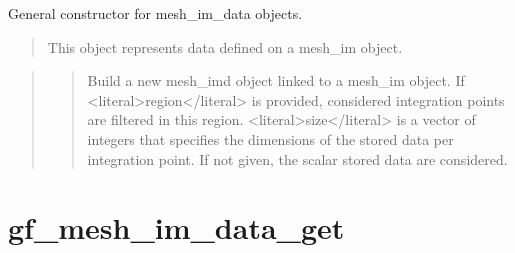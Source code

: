 \documentclass[a4paper,11pt,english]{sphinxmanual}
\begin{document}
\sphinxAtStartPar
{}

\sphinxAtStartPar
General constructor for mesh\_im\_data objects.
\begin{quote}

\sphinxAtStartPar
This object represents data defined on a mesh\_im object.
\end{quote}

\sphinxAtStartPar
{}
\begin{quote}

\sphinxAtStartPar
{}
\begin{quote}

\sphinxAtStartPar
Build a new mesh\_imd object linked to a mesh\_im object. If \textless{}literal\textgreater{}region\textless{}/literal\textgreater{} is
provided, considered integration points are filtered in this region.
\textless{}literal\textgreater{}size\textless{}/literal\textgreater{} is a vector of integers that specifies the dimensions of the
stored data per integration point. If not given, the scalar stored
data are considered.
\end{quote}
\end{quote}


\section{gf\_mesh\_im\_data\_get}
\label{\detokenize{scilab/cmdref_gf_mesh_im_data_get:gf-mesh-im-data-get}}\label{\detokenize{scilab/cmdref_gf_mesh_im_data_get::doc}}
\sphinxAtStartPar
{}

\begin{sphinxVerbatim}[commandchars=\\\{\}]
  
  
  
  
  
    
\end{sphinxVerbatim}
\end{document}
